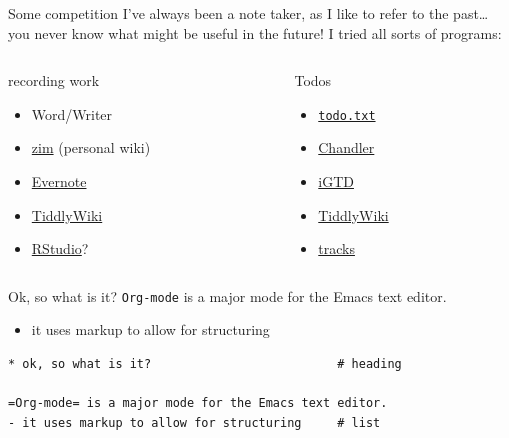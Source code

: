 \documentclass[aspectratio=169,presentation,bigger,fleqn,t]{beamer}
\begin{document}
\begin{frame}[fragile,label={sec:orgheadline5}]{Some competition}
 I've always been a note taker, as I like to refer to the past\ldots{} you never know what
might be useful in the future! I tried all sorts of programs:

\begin{columns}
\begin{column}{0.5\columnwidth}
\begin{block}{recording work}
\begin{itemize}
\item Word/Writer
\item \href{http://zim-wiki.org/}{zim} (personal wiki)
\item \href{https://evernote.com/}{Evernote}
\item \href{http://tiddlywiki.com/}{TiddlyWiki}
\item \href{https://www.rstudio.com/}{RStudio}?
\end{itemize}
\end{block}
\end{column}


\begin{column}{0.5\columnwidth}
\begin{block}{Todos}
\begin{itemize}
\item \href{http://todotxt.com/}{\texttt{todo.txt}}
\item \href{https://en.wikipedia.org/wiki/Chandler_(software)}{Chandler}
\item \href{https://itunes.apple.com/us/app/igtd/id488595283?mt=8}{iGTD}
\item \href{http://tiddlywiki.com/}{TiddlyWiki}
\item \href{http://www.getontracks.org/}{tracks}
\end{itemize}
\end{block}
\end{column}
\end{columns}
\end{frame}

\begin{frame}[fragile,label={sec:orgheadline6}]{Ok, so what is it?}
 \texttt{Org-mode} is a major mode for the Emacs text editor.
\begin{itemize}
\item it uses markup to allow for structuring
\end{itemize}

\begin{verbatim}
* ok, so what is it?                          # heading

=Org-mode= is a major mode for the Emacs text editor.
- it uses markup to allow for structuring     # list
\end{verbatim}
\end{frame}
\end{document}
